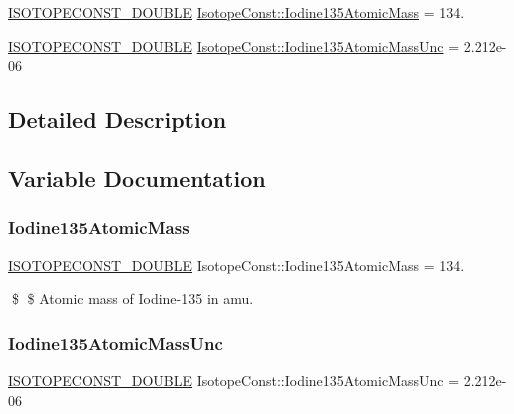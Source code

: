 \begin{DoxyCompactItemize}
\item 
\mbox{\hyperlink{group___isotope_const-_macros_ga8f45a7272ce02c0b4c65c44636ed719a}{I\+S\+O\+T\+O\+P\+E\+C\+O\+N\+S\+T\+\_\+\+D\+O\+U\+B\+LE}} \mbox{\hyperlink{group___isotope_const-_iodine-_i135_ga45c33ec440679f6d0d8b756f131e76be}{Isotope\+Const\+::\+Iodine135\+Atomic\+Mass}} = 134.
\item 
\mbox{\hyperlink{group___isotope_const-_macros_ga8f45a7272ce02c0b4c65c44636ed719a}{I\+S\+O\+T\+O\+P\+E\+C\+O\+N\+S\+T\+\_\+\+D\+O\+U\+B\+LE}} \mbox{\hyperlink{group___isotope_const-_iodine-_i135_ga2c8822beef5b0ca230d77d501031c203}{Isotope\+Const\+::\+Iodine135\+Atomic\+Mass\+Unc}} = 2.\+212e-\/06
\end{DoxyCompactItemize}


\subsection{Detailed Description}


\subsection{Variable Documentation}
\mbox{\label{group___isotope_const-_iodine-_i135_ga45c33ec440679f6d0d8b756f131e76be}} 
\subsubsection{\texorpdfstring{Iodine135\+Atomic\+Mass}{Iodine135AtomicMass}}
{\footnotesize\ttfamily \mbox{\hyperlink{group___isotope_const-_macros_ga8f45a7272ce02c0b4c65c44636ed719a}{I\+S\+O\+T\+O\+P\+E\+C\+O\+N\+S\+T\+\_\+\+D\+O\+U\+B\+LE}} Isotope\+Const\+::\+Iodine135\+Atomic\+Mass = 134.}

\$ \$ Atomic mass of Iodine-\/135 in amu. \mbox{\label{group___isotope_const-_iodine-_i135_ga2c8822beef5b0ca230d77d501031c203}} 
\subsubsection{\texorpdfstring{Iodine135\+Atomic\+Mass\+Unc}{Iodine135AtomicMassUnc}}
{\footnotesize\ttfamily \mbox{\hyperlink{group___isotope_const-_macros_ga8f45a7272ce02c0b4c65c44636ed719a}{I\+S\+O\+T\+O\+P\+E\+C\+O\+N\+S\+T\+\_\+\+D\+O\+U\+B\+LE}} Isotope\+Const\+::\+Iodine135\+Atomic\+Mass\+Unc = 2.\+212e-\/06}

